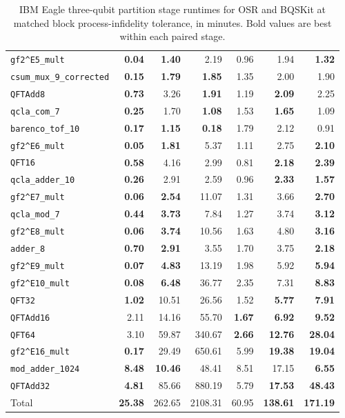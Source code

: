 \begin{table}[p]
\begin{tabular}{l|rrr|rrr}
\texttt{gf2\textasciicircum{}E5\_mult} & \textbf{0.04} & \textbf{1.40} & 2.19 & 0.96 & 1.94 & \textbf{1.32} \\
\texttt{csum\_mux\_9\_corrected} & \textbf{0.15} & \textbf{1.79} & \textbf{1.85} & 1.35 & 2.00 & 1.90 \\
\texttt{QFTAdd8} & \textbf{0.73} & 3.26 & \textbf{1.91} & 1.19 & \textbf{2.09} & 2.25 \\
\texttt{qcla\_com\_7} & \textbf{0.25} & 1.70 & \textbf{1.08} & 1.53 & \textbf{1.65} & 1.09 \\
\texttt{barenco\_tof\_10} & \textbf{0.17} & \textbf{1.15} & \textbf{0.18} & 1.79 & 2.12 & 0.91 \\
\texttt{gf2\textasciicircum{}E6\_mult} & \textbf{0.05} & \textbf{1.81} & 5.37 & 1.11 & 2.75 & \textbf{2.10} \\
\texttt{QFT16} & \textbf{0.58} & 4.16 & 2.99 & 0.81 & \textbf{2.18} & \textbf{2.39} \\
\texttt{qcla\_adder\_10} & \textbf{0.26} & 2.91 & 2.59 & 0.96 & \textbf{2.33} & \textbf{1.57} \\
\texttt{gf2\textasciicircum{}E7\_mult} & \textbf{0.06} & \textbf{2.54} & 11.07 & 1.31 & 3.66 & \textbf{2.70} \\
\texttt{qcla\_mod\_7} & \textbf{0.44} & \textbf{3.73} & 7.84 & 1.27 & 3.74 & \textbf{3.12} \\
\texttt{gf2\textasciicircum{}E8\_mult} & \textbf{0.06} & \textbf{3.74} & 10.56 & 1.63 & 4.80 & \textbf{3.16} \\
\texttt{adder\_8} & \textbf{0.70} & \textbf{2.91} & 3.55 & 1.70 & 3.75 & \textbf{2.18} \\
\texttt{gf2\textasciicircum{}E9\_mult} & \textbf{0.07} & \textbf{4.83} & 13.19 & 1.98 & 5.92 & \textbf{5.94} \\
\texttt{gf2\textasciicircum{}E10\_mult} & \textbf{0.08} & \textbf{6.48} & 36.77 & 2.35 & 7.31 & \textbf{8.83} \\
\texttt{QFT32} & \textbf{1.02} & 10.51 & 26.56 & 1.52 & \textbf{5.77} & \textbf{7.91} \\
\texttt{QFTAdd16} & 2.11 & 14.16 & 55.70 & \textbf{1.67} & \textbf{6.92} & \textbf{9.52} \\
\texttt{QFT64} & 3.10 & 59.87 & 340.67 & \textbf{2.66} & \textbf{12.76} & \textbf{28.04} \\
\texttt{gf2\textasciicircum{}E16\_mult} & \textbf{0.17} & 29.49 & 650.61 & 5.99 & \textbf{19.38} & \textbf{19.04} \\
\texttt{mod\_adder\_1024} & \textbf{8.48} & \textbf{10.46} & 48.41 & 8.51 & 17.15 & \textbf{6.55} \\
\texttt{QFTAdd32} & \textbf{4.81} & 85.66 & 880.19 & 5.79 & \textbf{17.53} & \textbf{48.43} \\
\hline
Total & \textbf{25.38} & 262.65 & 2108.31 & 60.95 & \textbf{138.61} & \textbf{171.19} \\
\hline
\end{tabular}
\caption{IBM Eagle three-qubit partition stage runtimes for OSR and BQSKit at matched block process-infidelity tolerance, in minutes. Bold values are best within each paired stage.}
\label{tab:osr-bqskit-three-qubit-ibm-eagle-times}
\end{table}
